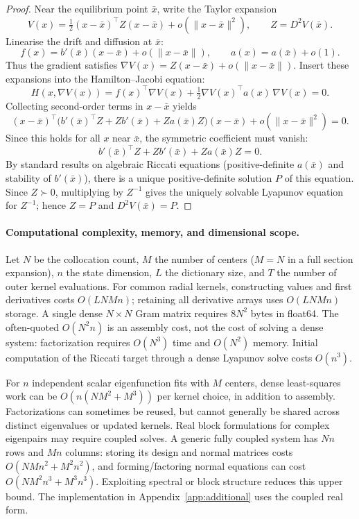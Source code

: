 \documentclass[11pt]{article}
\theoremstyle{plain}      %
\theoremstyle{definition} %
\begin{document}
\begin{proof}
Near the equilibrium point $\bar{x}$, write the Taylor expansion
\[
V(x)=\tfrac{1}{2}(x-\bar{x})^\top Z(x-\bar{x})
+o\!\left(\|x-\bar{x}\|^{2}\right),
\qquad Z=D^{2}V(\bar{x}).
\]
Linearise the drift and diffusion at $\bar{x}$:
\[
f(x)=b'(\bar{x})(x-\bar{x})+o(\|x-\bar{x}\|),\qquad
a(x)=a(\bar{x})+o(1).
\]
Thus the gradient satisfies $\nabla V(x)=Z(x-\bar{x})+o(\|x-\bar{x}\|)$.
Insert these expansions into the Hamilton--Jacobi equation:
\[
H(x,\nabla V(x))=
f(x)^\top\nabla V(x)
+\tfrac{1}{2}\nabla V(x)^\top a(x)\,\nabla V(x)=0.
\]
Collecting second-order terms in $x-\bar{x}$ yields
\[
(x-\bar{x})^\top\!
\bigl(b'(\bar{x})^\top Z + Z b'(\bar{x})
+Z a(\bar{x})Z\bigr)(x-\bar{x})
+o\!\left(\|x-\bar{x}\|^{2}\right)=0.
\]
Since this holds for all $x$ near $\bar{x}$, the symmetric coefficient must vanish:
\[
b'(\bar{x})^\top Z + Z b'(\bar{x}) + Z a(\bar{x})Z =0.
\]
By standard results on algebraic Riccati equations (positive-definite $a(\bar{x})$ and stability of $b'(\bar{x})$), there is a unique positive-definite solution $P$ of this equation.
Since $Z\succ0$, multiplying by $Z^{-1}$ gives the uniquely solvable Lyapunov equation for $Z^{-1}$; hence $Z=P$ and $D^{2}V(\bar{x})=P$.
\end{proof}



\paragraph{Computational complexity, memory, and dimensional scope.}\label{sec:complexity-full}
Let $N$ be the collocation count, $M$ the number of centers ($M=N$ in a full section expansion), $n$ the state dimension, $L$ the dictionary size, and $T$ the number of outer kernel evaluations. For common radial kernels, constructing values and first derivatives costs $O(LNMn)$; retaining all derivative arrays uses $O(LNMn)$ storage. A single dense $N\times N$ Gram matrix requires $8N^2$ bytes in float64. The often-quoted $O(N^2n)$ is an assembly cost, not the cost of solving a dense system: factorization requires $O(N^3)$ time and $O(N^2)$ memory. Initial computation of the Riccati target through a dense Lyapunov solve costs $O(n^3)$.

For $n$ independent scalar eigenfunction fits with $M$ centers, dense least-squares work can be $O(n(NM^2+M^3))$ per kernel choice, in addition to assembly. Factorizations can sometimes be reused, but cannot generally be shared across distinct eigenvalues or updated kernels. Real block formulations for complex eigenpairs may require coupled solves. A generic fully coupled system has $Nn$ rows and $Mn$ columns: storing its design and normal matrices costs $O(NMn^2+M^2n^2)$, and forming/factoring normal equations can cost $O(NM^2n^3+M^3n^3)$. Exploiting spectral or block structure reduces this upper bound. The implementation in Appendix~\ref{app:additional} uses the coupled real form.
\end{document}
